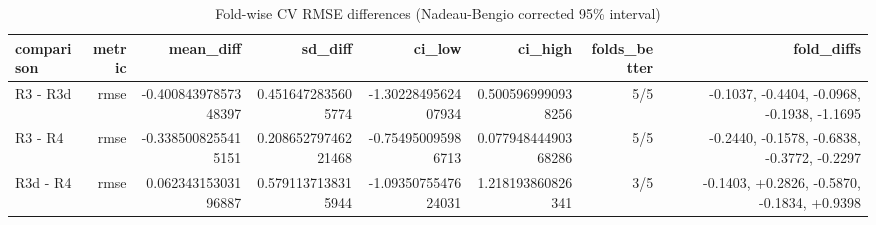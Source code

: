 \begin{table}[htbp]
\centering
\small
\caption{Fold-wise CV RMSE differences (Nadeau-Bengio corrected 95\% interval)}
\begin{tabular}{lrrrrrrr}
\toprule
comparison & metric & mean\_diff & sd\_diff & ci\_low & ci\_high & folds\_better & fold\_diffs \\
\midrule
R3 - R3d & rmse & -0.40084397857348397 & 0.4516472835605774 & -1.3022849562407934 & 0.5005969990938256 & 5/5 & -0.1037, -0.4404, -0.0968, -0.1938, -1.1695 \\
R3 - R4 & rmse & -0.3385008255415151 & 0.20865279746221468 & -0.754950095986713 & 0.07794844490368286 & 5/5 & -0.2440, -0.1578, -0.6838, -0.3772, -0.2297 \\
R3d - R4 & rmse & 0.06234315303196887 & 0.5791137138315944 & -1.0935075547624031 & 1.218193860826341 & 3/5 & -0.1403, +0.2826, -0.5870, -0.1834, +0.9398 \\
\bottomrule
\end{tabular}
\par\smallskip\begin{minipage}{\linewidth}\footnotesize \end{minipage}
\end{table}

